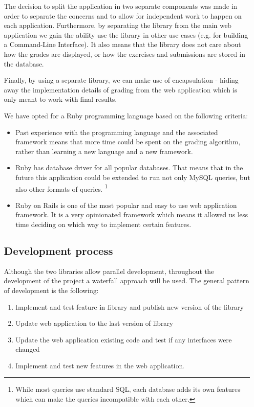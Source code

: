The decision to split the application in two separate components was made in order to separate the concerns and to allow for independent work to happen on each application. Furthermore, by separating the library from the main web application we gain the ability use the library in other use cases (e.g. for building a Command-Line Interface). It also means that the library does not care about how the grades are displayed, or how the exercises and submissions are stored in the database.

Finally, by using a separate library, we can make use of encapsulation - hiding away the implementation details of grading from the web application which is only meant to work with final results.

We have opted for a Ruby programming language based on the following criteria:

\begin{itemize}
    \item Past experience with the programming language and the associated framework means that more time could be spent on the grading algorithm, rather than learning a new language and a new framework.
    \item Ruby has database driver for all popular databases. That means that in the future this application could be extended to run not only MySQL queries, but also other formats of queries. \footnote{While most queries use standard SQL, each database adds its own features which can make the queries incompatible with each other.}
    \item Ruby on Rails is one of the most popular and easy to use web application framework. It is a very opinionated framework which means it allowed us less time deciding on which way to implement certain features.
\end{itemize}

\subsection{Development process}

Although the two libraries allow parallel development, throughout the development of the project a waterfall approach will be used. The general pattern of development is the following:

\begin{enumerate}
  \item Implement and test feature in library and publish new version of the library
  \item Update web application to the last version of library
  \item Update the web application existing code and test if any interfaces were changed
  \item Implement and test new features in the web application.
\end{enumerate}

